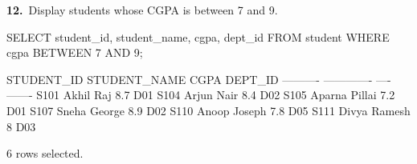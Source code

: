 \noindent\begin{minipage}{\linewidth}
\begingroup{}
{\fontsize{14}{17}\selectfont\textbf{12.}}\ Display students whose CGPA is between 7 and 9.\par
\endgroup\vspace{12pt}


\begin{sqlcode}
SELECT student_id, student_name, cgpa, dept_id
FROM student WHERE cgpa BETWEEN 7 AND 9;
\end{sqlcode}

\vspace{18pt}


\begin{sqlout}[fontsize=\small]
STUDENT_ID  STUDENT_NAME   CGPA  DEPT_ID
----------  -------------  ----  -------
S101        Akhil Raj       8.7  D01
S104        Arjun Nair      8.4  D02
S105        Aparna Pillai   7.2  D01
S107        Sneha George    8.9  D02
S110        Anoop Joseph    7.8  D05
S111        Divya Ramesh      8  D03

6 rows selected.
\end{sqlout}
\end{minipage}\par\vspace{24pt}

